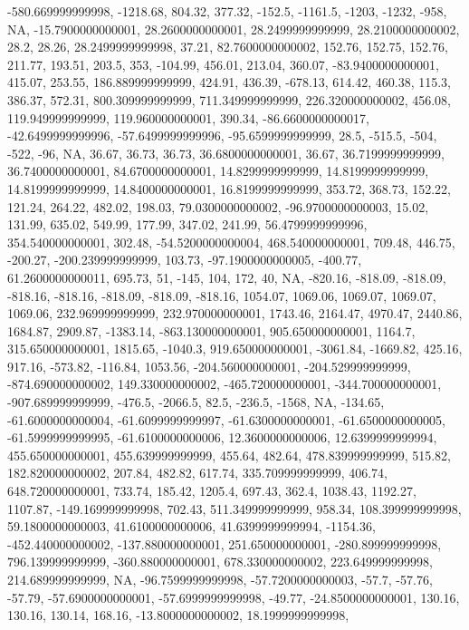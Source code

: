 \documentclass[
]{article}
\begin{document}
-580.669999999998, -1218.68, 804.32, 377.32, -152.5, -1161.5, -1203,
-1232, -958, NA, -15.7900000000001, 28.2600000000001, 28.2499999999999,
28.2100000000002, 28.2, 28.26, 28.2499999999998, 37.21,
82.7600000000002, 152.76, 152.75, 152.76, 211.77, 193.51, 203.5, 353,
-104.99, 456.01, 213.04, 360.07, -83.9400000000001, 415.07, 253.55,
186.889999999999, 424.91, 436.39, -678.13, 614.42, 460.38, 115.3,
386.37, 572.31, 800.309999999999, 711.349999999999, 226.320000000002,
456.08, 119.949999999999, 119.960000000001, 390.34, -86.6600000000017,
-42.6499999999996, -57.6499999999996, -95.6599999999999, 28.5, -515.5,
-504, -522, -96, NA, 36.67, 36.73, 36.73, 36.6800000000001, 36.67,
36.7199999999999, 36.7400000000001, 84.6700000000001, 14.8299999999999,
14.8199999999999, 14.8199999999999, 14.8400000000001, 16.8199999999999,
353.72, 368.73, 152.22, 121.24, 264.22, 482.02, 198.03,
79.0300000000002, -96.9700000000003, 15.02, 131.99, 635.02, 549.99,
177.99, 347.02, 241.99, 56.4799999999996, 354.540000000001, 302.48,
-54.5200000000004, 468.540000000001, 709.48, 446.75, -200.27,
-200.239999999999, 103.73, -97.1900000000005, -400.77, 61.2600000000011,
695.73, 51, -145, 104, 172, 40, NA, -820.16, -818.09, -818.09, -818.16,
-818.16, -818.09, -818.09, -818.16, 1054.07, 1069.06, 1069.07, 1069.07,
1069.06, 232.969999999999, 232.970000000001, 1743.46, 2164.47, 4970.47,
2440.86, 1684.87, 2909.87, -1383.14, -863.130000000001,
905.650000000001, 1164.7, 315.650000000001, 1815.65, -1040.3,
919.650000000001, -3061.84, -1669.82, 425.16, 917.16, -573.82, -116.84,
1053.56, -204.560000000001, -204.529999999999, -874.690000000002,
149.330000000002, -465.720000000001, -344.700000000001,
-907.689999999999, -476.5, -2066.5, 82.5, -236.5, -1568, NA, -134.65,
-61.6000000000004, -61.6099999999997, -61.6300000000001,
-61.6500000000005, -61.5999999999995, -61.6100000000006,
12.3600000000006, 12.6399999999994, 455.650000000001, 455.639999999999,
455.64, 482.64, 478.839999999999, 515.82, 182.820000000002, 207.84,
482.82, 617.74, 335.709999999999, 406.74, 648.720000000001, 733.74,
185.42, 1205.4, 697.43, 362.4, 1038.43, 1192.27, 1107.87,
-149.169999999998, 702.43, 511.349999999999, 958.34, 108.399999999998,
59.1800000000003, 41.6100000000006, 41.6399999999994, -1154.36,
-452.440000000002, -137.880000000001, 251.650000000001,
-280.899999999998, 796.139999999999, -360.880000000001,
678.330000000002, 223.649999999998, 214.689999999999, NA,
-96.7599999999998, -57.7200000000003, -57.7, -57.76, -57.79,
-57.6900000000001, -57.6999999999998, -49.77, -24.8500000000001, 130.16,
130.16, 130.14, 168.16, -13.8000000000002, 18.1999999999998,
\end{document}
